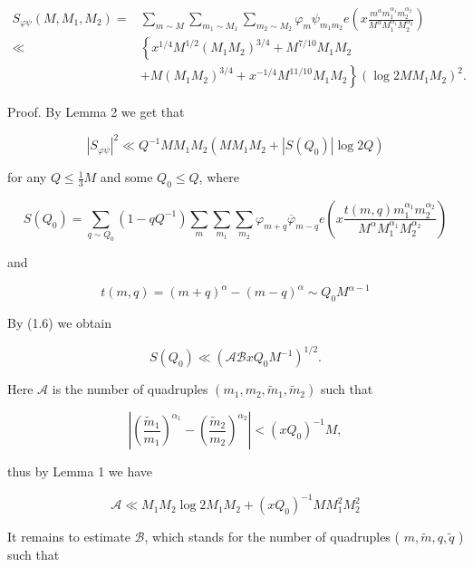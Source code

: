 \documentclass[10pt]{article}
\begin{document}
$$
\begin{aligned}
S_{\varphi\psi}\left(M, M_{1}, M_{2}\right)= & \sum_{m \sim M} \sum_{m_{1} \sim M_{1}} \sum_{m_{2} \sim M_{2}} \varphi_{m} \psi_{m_{1} m_{2}} e\left(x \frac{m^{\alpha} m_{1}^{\alpha_{1}} m_{2}^{\alpha_{2}}}{M^{\alpha} M_{1}^{\alpha_{1}} M_{2}^{\alpha_{2}}}\right) \\
\ll & \left\{x^{1 / 4} M^{1 / 2}\left(M_{1} M_{2}\right)^{3 / 4}+M^{7 / 10} M_{1} M_{2}\right. \\
& \left.+M\left(M_{1} M_{2}\right)^{3 / 4}+x^{-1 / 4} M^{11 / 10} M_{1} M_{2}\right\}\left(\log 2 M M_{1} M_{2}\right)^{2} .
\end{aligned}
$$

Proof. By Lemma 2 we get that

$$
\left|S_{\varphi\psi}\right|^{2} \ll Q^{-1} M M_{1} M_{2}\left(M M_{1} M_{2}+\left|S\left(Q_{0}\right)\right| \log 2 Q\right)
$$

for any $Q \leqslant \frac{1}{3} M$ and some $Q_{0} \leqslant Q$, where

$$
S\left(Q_{0}\right)=\sum_{q \sim Q_{0}}\left(1-q Q^{-1}\right) \sum_{m} \sum_{m_{1}} \sum_{m_{2}} \varphi_{m+q} \overline{\varphi}_{m-q} e\left(x \frac{t(m, q) m_{1}^{\alpha_{1}} m_{2}^{\alpha_{2}}}{M^{\alpha} M_{1}^{\alpha_{1}} M_{2}^{\alpha_{2}}}\right)
$$

and

$$
t(m, q)=(m+q)^{\alpha}-(m-q)^{\alpha} \sim Q_{0} M^{\alpha-1}
$$

By (1.6) we obtain


\begin{equation*}
S\left(Q_{0}\right)\ll\left(\mathscr{A}\mathscr{B}xQ_{0}M^{-1}\right)^{1/2} . \tag{3.1}
\end{equation*}


Here $\mathscr{A}$ is the number of quadruples $\left(m_{1}, m_{2}, \tilde{m}_{1}, \tilde{m}_{2}\right)$ such that

$$
\left|\left(\frac{\tilde{m}_{1}}{m_{1}}\right)^{\alpha_{1}}-\left(\frac{\tilde{m}_{2}}{m_{2}}\right)^{\alpha_{2}}\right|<\left(x Q_{0}\right)^{-1} M,
$$

thus by Lemma 1 we have


\begin{equation*}
\mathscr{A} \ll M_{1} M_{2} \log 2 M_{1} M_{2}+\left(x Q_{0}\right)^{-1} M M_{1}^{2} M_{2}^{2} \tag{3.2}
\end{equation*}


It remains to estimate $\mathscr{B}$, which stands for the number of quadruples ( $m, \tilde{m}, q, \tilde{q}$ ) such that
\end{document}
